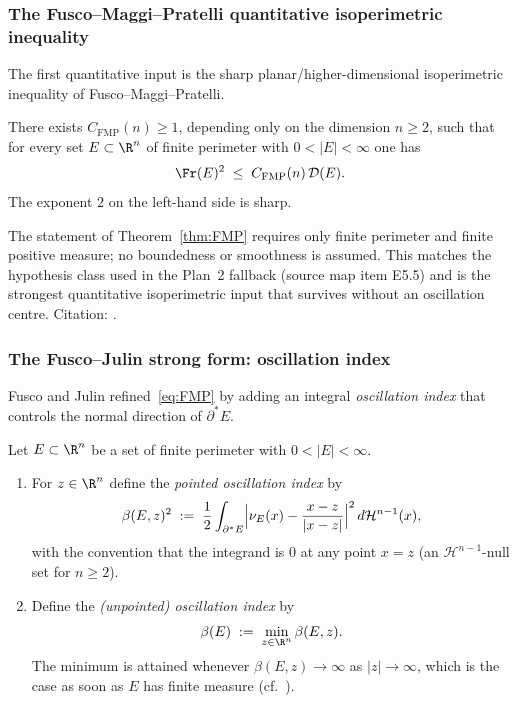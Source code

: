 \subsubsection{The Fusco--Maggi--Pratelli quantitative isoperimetric
inequality}\label{ssec:FMP}

The first quantitative input is the sharp planar/higher-dimensional
isoperimetric inequality of Fusco--Maggi--Pratelli.

\begin{theorem}
\label{thm:FMP}
There exists $C_{\mathrm{FMP}}(n)\ge 1$, depending only on the dimension
$n\ge 2$, such that for every set $E\subset\R^n$ of finite perimeter
with $0<|E|<\infty$ one has
\begin{equation}\label{eq:FMP}
   \Fr(E)^2\;\le\;C_{\mathrm{FMP}}(n)\,\mathcal D(E).
\end{equation}
The exponent $2$ on the left-hand side is sharp.
\end{theorem}

\begin{remark}[Hypotheses]
The statement of Theorem~\ref{thm:FMP} requires only finite perimeter
and finite positive measure; no boundedness or smoothness is assumed.
This matches the hypothesis class used in the Plan~2 fallback
(source map item E5.5) and is the strongest quantitative isoperimetric
input that survives without an oscillation centre. Citation:
\cite[Thm.~1.1]{FMP2008}.
\end{remark}

\subsubsection{The Fusco--Julin strong form: oscillation
index}\label{ssec:FJ}

Fusco and Julin refined~\eqref{eq:FMP} by adding an integral
\emph{oscillation index} that controls the normal direction of
$\partial^*E$.

\begin{definition}
\label{def:beta}
Let $E\subset\R^n$ be a set of finite perimeter with $0<|E|<\infty$.
\begin{enumerate}
\item For $z\in\R^n$ define the \emph{pointed oscillation index} by
\begin{equation}\label{eq:beta-def-pointed}
   \beta(E,z)^2
   \;:=\;
   \frac1{2}\int_{\partial^*E}
   \Bigl|\nu_E(x)-\frac{x-z}{|x-z|}\Bigr|^2\,d\mathcal H^{n-1}(x),
\end{equation}
with the convention that the integrand is $0$ at any point $x=z$ (an
$\mathcal H^{n-1}$-null set for $n\ge 2$).
\item Define the \emph{(unpointed) oscillation index} by
\begin{equation}\label{eq:beta-def-unpointed}
   \beta(E)
   \;:=\;
   \min_{z\in\R^n}\beta(E,z).
\end{equation}
The minimum is attained whenever $\beta(E,z)\to\infty$ as
$|z|\to\infty$, which is the case as soon as $E$ has finite measure
(cf.~\cite[\S2]{FJ2014}).
\end{enumerate}
\end{definition}

